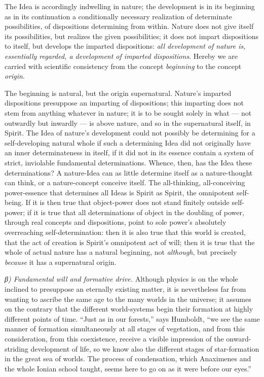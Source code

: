 \documentclass[12pt,a4paper]{book}
\newcommand{\subrunin}[1]{\emph{#1}\hspace{0.4em}}
\begin{document}
The Idea is accordingly indwelling in nature; the development is in its beginning as in its continuation a
conditionally necessary
realization of determinate possibilities, of dispositions determining from within. Nature does not give itself
its possibilities, but realizes the given possibilities; it does not impart dispositions to itself, but develops
the imparted dispositions: \emph{all development of nature is, essentially regarded, a development of imparted
dispositions}. Hereby we are carried with scientific consistency from the concept \emph{beginning} to the concept
\emph{origin}.

The beginning is natural, but the origin supernatural. Nature's imparted dispositions presuppose an imparting of
dispositions; this imparting does not stem from anything whatever in nature; it is to be sought solely in what
--- not outwardly but inwardly --- is above nature, and so in the supernatural itself, in Spirit. The Idea of
nature's development could not possibly be determining for a self-developing natural whole if such a determining
Idea did not originally have an inner determinateness in itself, if it did not in its essence contain a system of
strict, inviolable fundamental determinations. Whence, then, has the Idea these determinations? A nature-Idea can
as little determine itself as a nature-thought can think, or a nature-concept conceive itself. The
all-thinking, all-conceiving power-essence that determines all Ideas is Spirit as Spirit, the omnipotent
self-being. If it is then true that object-power does not stand finitely outside self-power; if it is true that
all determinations of object in the doubling of power, through real concepts and dispositions, point to sole
power's absolutely overreaching self-determination: then it is also true that this world is created, that the act
of creation is Spirit's omnipotent act of will; then it is true that the whole of actual nature has a natural
beginning, not \emph{although}, but precisely \emph{because} it has a supernatural origin.

\subrunin{β) Fundamental will and formative drive.} Although physics is on the whole inclined to presuppose an
eternally
existing matter, it is nevertheless far from wanting to ascribe the same age to the many worlds in the universe;
it assumes on the contrary that the different world-systems begin their formation at highly different points of
time. ``Just as in our forests,'' says Humboldt, ``we see the same manner of formation simultaneously at all
stages of vegetation, and from this consideration, from this coexistence, receive a visible impression of the
onward-striding development of life, so we know also the different stages of star-formation in the great sea of
worlds. The process of condensation, which Anaximenes and the whole Ionian school taught, seems here to go on as
it were before our eyes.''
\end{document}
